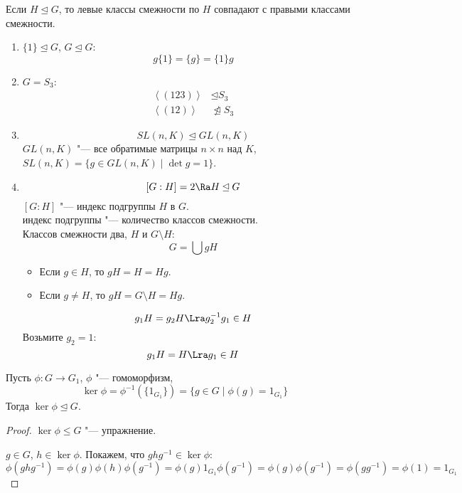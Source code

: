 \begin{conseq}
	Если $H \unlhd G$, то левые классы смежности по $H$ совпадают с правыми классами смежности.
\end{conseq}
\begin{exmp}\hfill\begin{enumerate}
\item
	$\{1\} \unlhd G$, $G \unlhd G$:
	\[ g\{1\} = \{g\} = \{1\}g \]

\item
	$G = S_3$:
	\begin{align*}
		\left<(123)\right> &\unlhd S_3 \\
		\left<(12)\right> &\ntrianglelefteq S_3
	\end{align*}

\item
	\[ SL(n, K) \unlhd GL(n, K) \]
	$GL(n, K)$ "--- все обратимые матрицы $n \times n$ над $K$,
	$SL(n, K) = \{g \in GL(n, K) \mid \det g = 1 \}$.

\item
	\[ [G:H] = 2 \Ra H \unlhd G \]
	$[G:H]$ "--- индекс подгруппы $H$ в $G$.\\
	индекс подгруппы "--- количество классов смежности.\\
	Классов смежности два, $H$ и $G \setminus H$:
	\[ G = \bigcup gH \]
	\begin{itemize}
		\item Если $g \in H$, то $gH = H = Hg$.
		\item Если $g \ne H$, то $gH = G \setminus H = Hg$.
	\end{itemize}
	\[ g_1H = g_2H \Lra g_2^{-1}g_1 \in H \]
	Возьмите $g_2 = 1$:
	\[ g_1H = H \Lra g_1 \in H \]
\end{enumerate}\end{exmp}

\begin{theorem}
	Пусть $\phi\colon G \to G_1$, $\phi$ "--- гомоморфизм,
	\[ \ker \phi = \phi^{-1}(\{1_{G_1}\}) = \{g \in G \mid \phi(g) = 1_{G_1}\} \]
	Тогда $\ker \phi \unlhd G$.
\end{theorem}
\begin{proof}
	$\ker \phi \le G$ "--- упражнение.

	$g \in G$, $h \in \ker \phi$.
	Покажем, что $ghg^{-1} \in \ker \phi$:
	\[
		\phi(ghg^{-1}) = \phi(g)\phi(h)\phi(g^{-1}) = \phi(g)1_{G_1}\phi(g^{-1}) = \phi(g)\phi(g^{-1}) = \phi(gg^{-1}) = \phi(1) = 1_{G_1}
	\]
\end{proof}

